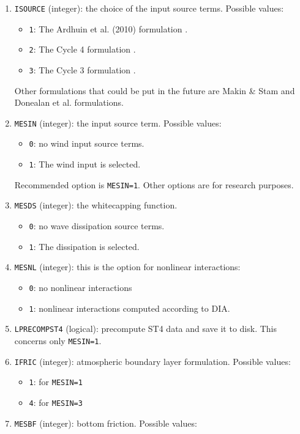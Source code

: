 \documentclass[12pt]{amsart}
\begin{document}
\begin{enumerate}
\item {\tt ISOURCE} (integer): the choice of the input source terms. Possible values:
  \begin{itemize}
  \item {\tt 1}: The Ardhuin et al. (2010) formulation \cite{ArdhuinSurfaceStressFormulation}.
  \item {\tt 2}: The Cycle 4 formulation \cite{CycleIV}.
  \item {\tt 3}: The Cycle 3 formulation \cite{WAMDIgroup}.
  \end{itemize}
Other formulations that could be put in the future are Makin \& Stam \cite{MakinStam} and Donealan et al. formulations.
\item {\tt MESIN} (integer): the input source term. Possible values:
  \begin{itemize}
  \item {\tt 0}: no wind input source terms.
  \item {\tt 1}: The wind input is selected.
  \end{itemize}
Recommended option is {\tt MESIN=1}. Other options are for research purposes.
\item {\tt MESDS} (integer): the whitecapping function.
  \begin{itemize}
  \item {\tt 0}: no wave dissipation source terms.
  \item {\tt 1}: The dissipation is selected.
  \end{itemize}
\item {\tt MESNL} (integer): this is the option for nonlinear interactions:
  \begin{itemize}
  \item {\tt 0}: no nonlinear interactions
  \item {\tt 1}: nonlinear interactions computed according to DIA.
  \end{itemize}
\item {\tt LPRECOMPST4} (logical): precompute ST4 data and save it to disk. This concerns only {\tt MESIN=1}. 
\item {\tt IFRIC} (integer): atmospheric boundary layer formulation. Possible values:
  \begin{itemize}
  \item {\tt 1}: for {\tt MESIN=1}
  \item {\tt 4}: for {\tt MESIN=3}
  \end{itemize}
\item {\tt MESBF} (integer): bottom friction. Possible values:

\end{enumerate}
\end{document}
